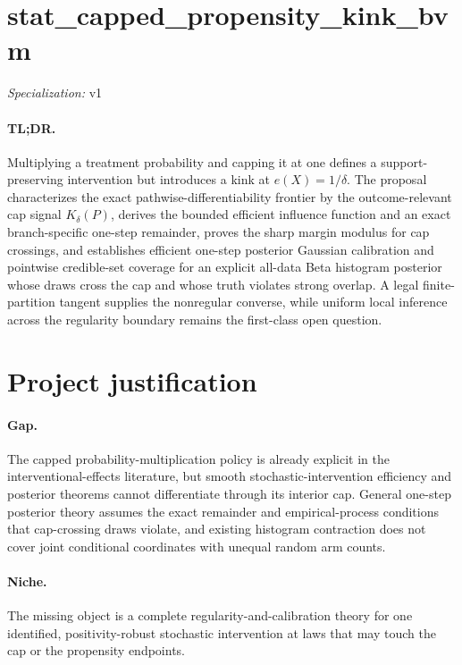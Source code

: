\documentclass{article}
\begin{document}
\sloppy

\section*{stat\_\allowbreak{}capped\_\allowbreak{}propensity\_\allowbreak{}kink\_\allowbreak{}bvm}

\noindent\textit{Specialization:} v1\par

\paragraph{TL;DR.} Multiplying a treatment probability and capping it at one defines a support-preserving intervention but introduces a kink at \(e(X)=1/\delta\). The proposal characterizes the exact pathwise-differentiability frontier by the outcome-relevant cap signal \(K_\delta(P)\), derives the bounded efficient influence function and an exact branch-specific one-step remainder, proves the sharp margin modulus for cap crossings, and establishes efficient one-step posterior Gaussian calibration and pointwise credible-set coverage for an explicit all-data Beta histogram posterior whose draws cross the cap and whose truth violates strong overlap. A legal finite-partition tangent supplies the nonregular converse, while uniform local inference across the regularity boundary remains the first-class open question.

\section{Project justification}

\paragraph{Gap.} The capped probability-multiplication policy is already explicit in the interventional-effects literature, but smooth stochastic-intervention efficiency and posterior theorems cannot differentiate through its interior cap. General one-step posterior theory assumes the exact remainder and empirical-process conditions that cap-crossing draws violate, and existing histogram contraction does not cover joint conditional coordinates with unequal random arm counts.

\paragraph{Niche.} The missing object is a complete regularity-and-calibration theory for one identified, positivity-robust stochastic intervention at laws that may touch the cap or the propensity endpoints.
\end{document}
